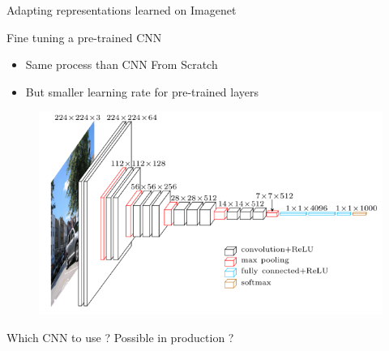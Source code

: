 \begin{frame}{Adapting representations learned on Imagenet}

	\begin{block}{\small Fine tuning a pre-trained CNN}
		\vspace{-.2cm}
	\begin{itemize}
		\item Same process than CNN From Scratch
		\item But smaller learning rate for pre-trained layers
	\end{itemize}
	\end{block}
	
		\vspace{-.4cm}
	
	\begin{figure}[h]
		\centering
		\includegraphics[width=.84\linewidth]{images/vgg16.png}
	\end{figure}

\end{frame}

\begin{frame}{Which CNN to use ? Possible in production ?}

		\begin{table}[h]
		\centering
			\caption{\small Forward+Backward with batches of 30 images.} 
			\label{table:cnnbenchmark}
		\end{table}

\end{frame}

